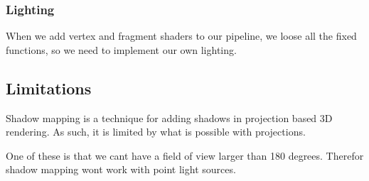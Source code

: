 \subsubsection*{Lighting}

When we add vertex and fragment shaders to our pipeline, we loose all
the fixed functions, so we need to implement our own lighting.

\subsection{Limitations}



Shadow mapping is a technique for adding shadows in projection based 
3D rendering. As such, it is limited by what is possible with projections.

One of these is that we cant have a field of view larger than 180
degrees. Therefor shadow mapping wont work with point
light sources.

